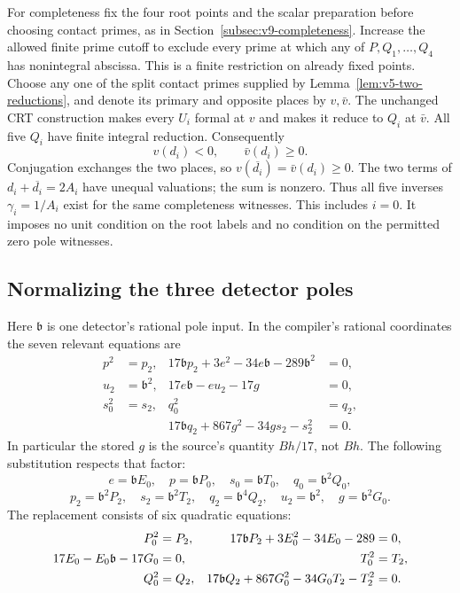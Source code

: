 For completeness fix the four root points and the scalar preparation
before choosing contact primes, as in Section~\ref{subsec:v9-completeness}.
Increase the allowed finite prime cutoff to exclude every prime at
which any of $P,Q_1,\ldots,Q_4$ has nonintegral abscissa.  This is a
finite restriction on already fixed points.  Choose any one of the
split contact primes supplied by Lemma~\ref{lem:v5-two-reductions},
and denote its primary and opposite places by $v,\bar v$.
The unchanged CRT construction makes every $U_i$ formal at $v$ and
makes it reduce to $Q_i$ at $\bar v$.  All five $Q_i$ have finite
integral reduction.  Consequently
\[
 v(d_i)<0,\qquad \bar v(d_i)\ge0.
\]
Conjugation exchanges the two places, so
$v(\overline{d_i})=\bar v(d_i)\ge0$.  The two terms of
$d_i+\overline{d_i}=2A_i$ have unequal valuations; the sum is nonzero.
Thus all five inverses $\gamma_i=1/A_i$ exist for the same completeness
witnesses.  This includes $i=0$.  It imposes no unit condition on the
root labels and no condition on the permitted zero pole witnesses.

\subsection{Normalizing the three detector poles}\label{subsec:v12-poles}

Here $\mathfrak b$ is one detector's rational pole input.  In the
compiler's rational coordinates the seven relevant equations are
\begin{align*}
 p^2&=p_2,&17\mathfrak b p_2+3e^2-34e\mathfrak b-289\mathfrak b^2&=0,\\
 u_2&=\mathfrak b^2,&17e\mathfrak b-eu_2-17g&=0,\\
 s_0^2&=s_2,&q_0^2&=q_2,\\
 &&17\mathfrak b q_2+867g^2-34gs_2-s_2^2&=0.
\end{align*}
In particular the stored $g$ is the source's quantity $Bh/17$,
not $Bh$.  The following substitution respects that factor:
\[
 e=\mathfrak b E_0,\quad p=\mathfrak b P_0,\quad
 s_0=\mathfrak b T_0,\quad q_0=\mathfrak b^2Q_0,
\]
\[
 p_2=\mathfrak b^2P_2,\quad s_2=\mathfrak b^2T_2,\quad
 q_2=\mathfrak b^4Q_2,\quad
 u_2=\mathfrak b^2,\quad g=\mathfrak b^2G_0.
\]
The replacement consists of six quadratic equations:
\begin{align}\label{eq:v12-pole-normalized}
 P_0^2&=P_2,&17\mathfrak b P_2+3E_0^2-34E_0-289&=0,\notag\\
 17E_0-E_0\mathfrak b-17G_0&=0,&T_0^2&=T_2,\\
 Q_0^2&=Q_2,&17\mathfrak b Q_2+867G_0^2-34G_0T_2-T_2^2&=0.\notag
\end{align}

